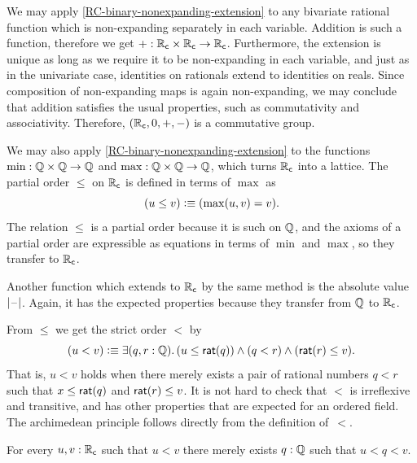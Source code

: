 We may apply \cref{RC-binary-nonexpanding-extension} to any bivariate rational function
which is non-expanding separately in each variable. Addition is such a function, therefore
we get ${+} : \mathbb{R}_\mathsf{c} \times \mathbb{R}_\mathsf{c} \to \mathbb{R}_\mathsf{c}$.
%
Furthermore, the extension is unique as long as we
require it to be non-expanding in each variable, and just as in the univariate case,
identities on rationals extend to identities on reals. Since composition of non-expanding
maps is again non-expanding, we may conclude that addition satisfies the usual properties,
such as commutativity and associativity.
%
Therefore, $(\mathbb{R}_\mathsf{c}, 0, {+}, {-})$ is a commutative
group.

We may also apply \cref{RC-binary-nonexpanding-extension} to the functions $\min : \mathbb{Q} \times
\mathbb{Q} \to \mathbb{Q}$ and $\max : \mathbb{Q} \times \mathbb{Q} \to \mathbb{Q}$, which turns $\mathbb{R}_\mathsf{c}$ into a lattice. The partial
order $\leq$ on $\mathbb{R}_\mathsf{c}$ is defined in terms of $\max$ as
%
%
%
\begin{equation*}
  (u \leq v) \vcentcolon\equiv (\max(u, v) = v).
\end{equation*}
%
The relation $\leq$ is a partial order because it is such on $\mathbb{Q}$, and the axioms of a
partial order are expressible as equations in terms of $\min$ and $\max$, so they transfer
to $\mathbb{R}_\mathsf{c}$.

%
Another function which extends to $\mathbb{R}_\mathsf{c}$ by the same method is the absolute value $|{\mathord{\hspace{1pt}\text{--}\hspace{1pt}}}|$.
Again, it has the expected properties because they transfer from $\mathbb{Q}$ to $\mathbb{R}_\mathsf{c}$.

From $\leq$ we get the strict order $<$ by
%
%
%
\begin{equation*}
  (u < v) \defeq \exis{q, r : \Q} (u \leq \rcrat(q)) \land (q < r) \land (\rcrat(r) \leq v).
\end{equation*}
%
That is, $u < v$ holds when there merely exists a pair of rational numbers $q < r$ such that $x \leq
\mathsf{rat}(q)$ and $\mathsf{rat}(r) \leq v$. It is not hard to check that $<$ is irreflexive and
transitive, and has other properties that are expected for an ordered field.
The archimedean principle follows directly from the definition of~$<$.

%
\begin{thm} \label{RC-archimedean}
  For every $u, v : \mathbb{R}_\mathsf{c}$ such that $u < v$ there merely exists $q : \mathbb{Q}$ such that $u < q < v$.
\end{thm}

